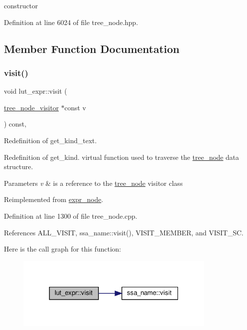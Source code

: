 constructor 



Definition at line 6024 of file tree\+\_\+node.\+hpp.



\subsection{Member Function Documentation}
\mbox{\label{structlut__expr_a038fb8662e73256339281dac776155d0}} 
\subsubsection{\texorpdfstring{visit()}{visit()}}
{\footnotesize\ttfamily void lut\+\_\+expr\+::visit (\begin{DoxyParamCaption}\item[{\hyperlink{classtree__node__visitor}{tree\+\_\+node\+\_\+visitor} $\ast$const}]{v }\end{DoxyParamCaption}) const\hspace{0.3cm}{\ttfamily [override]}, {\ttfamily [virtual]}}



Redefinition of get\+\_\+kind\+\_\+text. 

Redefinition of get\+\_\+kind. virtual function used to traverse the \hyperlink{classtree__node}{tree\+\_\+node} data structure. 
\begin{DoxyParams}{Parameters}
{\em v} & is a reference to the \hyperlink{classtree__node}{tree\+\_\+node} visitor class \\
\hline
\end{DoxyParams}


Reimplemented from \hyperlink{structexpr__node_aac767878f13ca07371dde2c3938ef38a}{expr\+\_\+node}.



Definition at line 1300 of file tree\+\_\+node.\+cpp.



References A\+L\+L\+\_\+\+V\+I\+S\+IT, ssa\+\_\+name\+::visit(), V\+I\+S\+I\+T\+\_\+\+M\+E\+M\+B\+ER, and V\+I\+S\+I\+T\+\_\+\+SC.

Here is the call graph for this function\+:
\nopagebreak
\begin{figure}[H]
\begin{center}
\leavevmode
\includegraphics[width=277pt]{d2/daa/structlut__expr_a038fb8662e73256339281dac776155d0_cgraph}
\end{center}
\end{figure}


